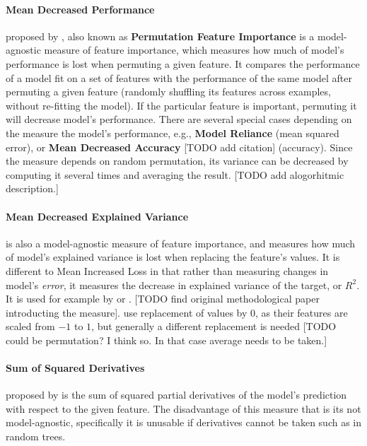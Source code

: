 			\paragraph{Mean Decreased Performance} proposed by \citep{fisher2019all}, also known as \textbf{Permutation Feature Importance} is a model-agnostic measure of feature importance, which measures how much of model's performance is lost when permuting a given feature. It compares the performance of a model fit on a set of features with the performance of the same model after permuting a given feature (randomly shuffling its features across examples, without re-fitting the model). If the particular feature is important, permuting it will decrease model's performance. There are several special cases depending on the measure the model's performance, e.g., \textbf{Model Reliance} \citep{fisher2019all} (mean squared error), or \textbf{Mean Decreased Accuracy} [TODO add citation] (accuracy). Since the measure depends on random permutation, its variance can be decreased by computing it several times and averaging the result. [TODO add alogorhitmic description.]	
			
			\paragraph{Mean Decreased Explained Variance} is also a model-agnostic measure of feature importance, and measures how much of model's explained variance is lost when replacing the feature's values.  It is different to Mean Increased Loss in that rather than measuring changes in model's \textit{error}, it measures the decrease in explained variance of the target, or $R^2$. It is used for example by \cite{gu2020empirical} or \cite{kelly2019characteristics}. [TODO find original methodological paper introducting the measure].  \cite{gu2020empirical} use replacement of values by 0, as their features are scaled from $-1$ to $1$, but generally a different replacement is needed [TODO could be permutation? I think so. In that case average needs to be taken.]
			
			\paragraph{Sum of Squared Derivatives} proposed by \cite{dimopoulos1995use} is the sum of squared partial derivatives of the model's prediction with respect to the given feature. The disadvantage of this measure that is its not model-agnostic, specifically it is unusable if derivatives cannot be taken such as in random trees. 
			

